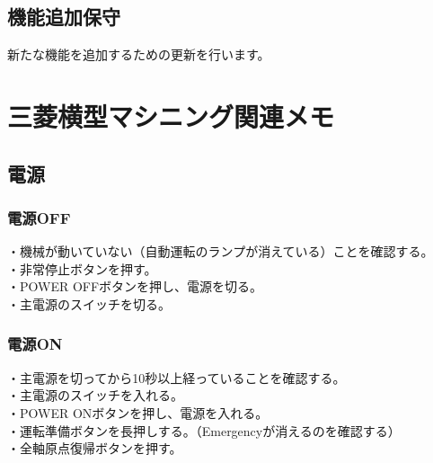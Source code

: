 \section{機能追加保守}
新たな機能を追加するための更新を行います。




\chapter{三菱横型マシニング関連メモ}




\section{電源}



\subsection{電源OFF}
・機械が動いていない（自動運転のランプが消えている）ことを確認する。\\
・非常停止ボタンを押す。\\
・POWER OFFボタンを押し、電源を切る。\\
・主電源のスイッチを切る。



\subsection{電源ON}
・主電源を切ってから10秒以上経っていることを確認する。\\
・主電源のスイッチを入れる。\\
・POWER ONボタンを押し、電源を入れる。\\
・運転準備ボタンを長押しする。（Emergencyが消えるのを確認する）\\
・全軸原点復帰ボタンを押す。




